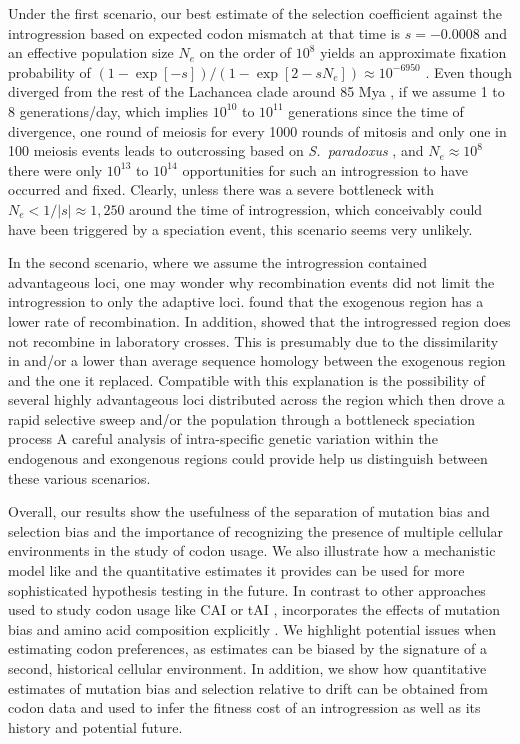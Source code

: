 \documentclass[fleqn,letterpaper]{article}
\begin{document}
Under the  first scenario, our best estimate of the selection coefficient against the introgression based on expected codon mismatch at that time is $s = -0.0008$ and an effective population size $N_e$ on the order of $10^8$ \citep{wagner2005} yields an approximate fixation probability of $(1-\exp[- s])/(1-\exp[2 - sN_e]) \approx 10^{-6950}$ \citep{SellaAndHirsh2005}.
Even though \kluyveri diverged from the rest of the Lachancea clade around 85 Mya \citep{kensche2008, MHM2015}, if we assume 1 to 8 generations/day, which implies $10^{10}$ to $10^{11}$ generations since the time of divergence, one round of meiosis for every 1000 rounds of mitosis and only one in 100 meiosis events leads to outcrossing based on \emph{S.~paradoxus} \citep{tsai2008}, and $N_e \approx 10^8$ there were only $10^{13}$ to $10^{14}$ opportunities for such an introgression to have occurred and fixed.
Clearly, unless there was a severe bottleneck with $N_e < 1/|s| \approx 1,250$ around the time of introgression, which conceivably could have been triggered by a speciation event, this scenario seems very unlikely.

In the second scenario, where we assume the introgression contained advantageous loci, one may wonder why recombination events did not limit the introgression to only the adaptive loci.
\citet{payen2009} found that the exogenous region has a lower rate of recombination. 
In addition, \citet{brion2017} showed that the introgressed region does not recombine in laboratory crosses.
This is presumably due to the dissimilarity in \GC and/or a lower than average sequence homology between the exogenous region and the one it replaced.
Compatible with this explanation is the possibility of several highly advantageous loci distributed across the region which then drove a rapid selective sweep and/or the population through a bottleneck speciation process
A careful analysis of intra-specific genetic variation within the endogenous and exongenous regions could provide help us distinguish between these various scenarios.

Overall, our results show the usefulness of the separation of mutation bias and selection bias and the importance of recognizing the presence of multiple cellular environments in the study of codon usage.
We also illustrate how a mechanistic model like \ROC and the quantitative estimates it provides can be used for more sophisticated hypothesis testing in the future.
In contrast to other approaches used to study codon usage like CAI \citep{sharp1987} or tAI \citep{dosreis2004}, \ROC incorporates the effects of mutation bias and amino acid composition explicitly \cite{cope2018}.
We highlight potential issues when estimating codon preferences, as estimates can be biased by the signature of a second, historical cellular environment.
In addition, we show how quantitative estimates of mutation bias and selection relative to drift can be obtained from codon data and used to infer the fitness cost of an introgression as well as its history and potential future.
\end{document}
